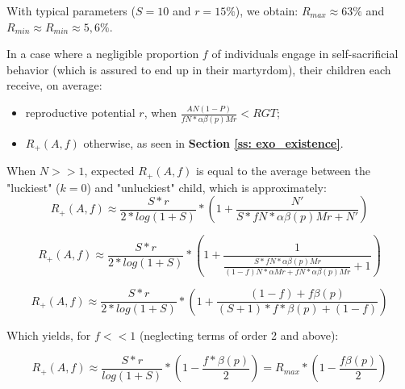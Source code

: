 \documentclass[a4paper,12pt]{article}
\begin{document}
With typical parameters ($S=10$ and $r=15\%$), we obtain: $R_{max} \approx 63 \%$ and 
$R_{min} \approx R_{min} \approx 5,6 \%$.

In a case where a negligible proportion $f$ of individuals engage in
self-sacrificial behavior (which is assured to end up in their martyrdom), their children each
receive, on average:
\begin{itemize}
\item reproductive potential $r$, when $\frac{AN(1-P)}{fN*\alpha\beta(p)Mr} < RGT$;
\item $R_{+}(A,f)$ otherwise, as seen in \textbf{Section \ref{ss: exo_existence}}.
\end{itemize}

When $N>>1$, expected $R_+(A,f)$ is equal to the average between the "luckiest" ($k=0$) and "unluckiest"
child, which is approximately:
\[ R_+(A,f) \approx \frac{S*r}{2*log(1+S)} * (1 + \frac{N'}{S*fN*\alpha\beta(p)Mr+N'})\]

\[ R_+(A,f) \approx \frac{S*r}{2*log(1+S)} * (1 + \frac{1}{\frac{S*fN*\alpha\beta(p)Mr}{(1-f)N*\alpha Mr + fN*\alpha\beta(p)Mr}+1})\]

\[ R_+(A,f) \approx \frac{S*r}{2*log(1+S)} * (1 + \frac{(1-f) + f\beta(p)}{(S+1)*f*\beta(p)+(1-f)})\]

Which yields, for $f<<1$ (neglecting terms of order 2 and above):

\begin{equation}
    R_+(A,f) \approx  \frac{S*r}{log(1+S)} * (1 - \frac{f*\beta(p)}{2}) = R_{max}*(1-\frac{f\beta(p)}{2})
\label{eq:R+}
\end{equation}
\end{document}
